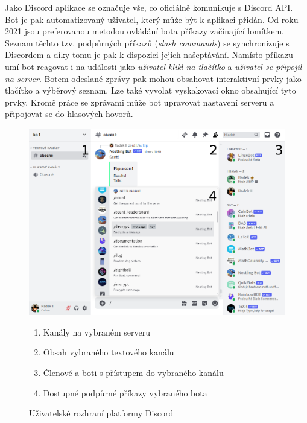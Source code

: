 \documentclass[FM]{tulthesis}
\begin{document}
	Jako Discord aplikace se označuje vše, co oficiálně komunikuje s Discord API. Bot je pak automatizovaný uživatel, který může být k aplikaci přidán. Od roku 2021 jsou preferovanou metodou ovládání bota příkazy začínající lomítkem. Seznam těchto tzv. podpůrných příkazů (\textit{slash commands}) se synchronizuje s Discordem a díky tomu je pak k dispozici jejich našeptávání. Namísto příkazu umí bot reagovat i na události jako \textit{uživatel klikl na tlačítko} a \textit{uživatel se připojil na server}. Botem odeslané zprávy pak mohou obsahovat interaktivní prvky jako tlačítko a výběrový seznam. Lze také vyvolat vyskakovací okno obsahující tyto prvky. Kromě práce se zprávami může bot upravovat nastavení serveru a připojovat se do hlasových hovorů. \cite{pdf_apps101}
	
	\begin{figure}[ht]
		\centering
		\includegraphics[width=\textwidth]{img/DiscordBotCommands}
		\begin{enumerate}[nolistsep]
			\item Kanály na vybraném serveru
			\item Obsah vybraného textového kanálu
			\item Členové a boti s přístupem do vybraného kanálu
			\item Dostupné podpůrné příkazy vybraného bota
		\end{enumerate}
		\caption{Uživatelské rozhraní platformy Discord}		
	\end{figure}
	
\end{document}
